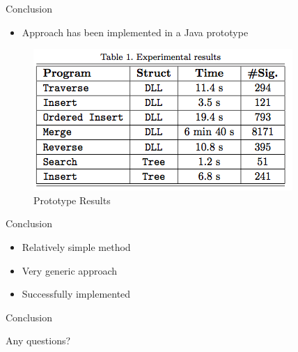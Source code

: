 \begin{frame}[fragile]{Conclusion}
    
    \pause

    \begin{itemize}
        \item <2-> Approach has been implemented in a Java prototype
    \end{itemize}

    \pause

    \begin{figure}
        \includegraphics[scale=0.5]{images/ResultTable.png}
        \\ \tiny{Prototype Results \cite{abdulla2013monotonic}}
    \end{figure}
\end{frame}

\begin{frame}[fragile]{Conclusion}
    
    \pause

    \begin{itemize}
        \item <2-> Relatively simple method
        \item <3-> Very generic approach
        \item <4-> Successfully implemented
    \end{itemize}

\end{frame}

\begin{frame}[fragile]{Conclusion}
    
    Any questions?

\end{frame}